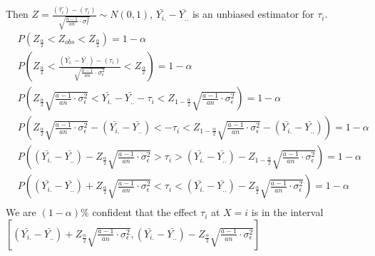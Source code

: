 \documentclass[11pt,letterpaper]{article}
\let\hat\widehat
\begin{document}
\noindent Then $Z = \frac{(\hat{\tau_i}) - (\tau_i)  }{\sqrt{\frac{a-1}{an} \cdot \sigma_{\epsilon}^2} } \sim N(0, 1)$, $\bar{Y_{i.}} - \bar{Y_{..}}$ is an unbiased estimator for $\tau_i$.
\begin{align*}
& P(Z_{\frac{\alpha}{2}} < Z_{obs} < Z_{\frac{\alpha}{2}}) = 1 - \alpha \\
& P(Z_{\frac{\alpha}{2}} <  \frac{(\bar{Y_{i.}} - \bar{Y_{..}}) - (\tau_i)  }{\sqrt{\frac{a-1}{an} \cdot \sigma_{\epsilon}^2} } < Z_{\frac{\alpha}{2}}) = 1 - \alpha \\
& P( Z_{\frac{\alpha}{2}} \sqrt{\frac{a-1}{an} \cdot \sigma_{\epsilon}^2} < \bar{Y_{i.}} - \bar{Y_{..}} - \tau_i < Z_{1-\frac{\alpha}{2}} \sqrt{\frac{a-1}{an} \cdot \sigma_{\epsilon}^2}) = 1 - \alpha \\
& P( Z_{\frac{\alpha}{2}} \sqrt{\frac{a-1}{an} \cdot \sigma_{\epsilon}^2} - ( \bar{Y_{i.}} - \bar{Y_{..}})<  - \tau_i < Z_{1-\frac{\alpha}{2}} \sqrt{\frac{a-1}{an} \cdot \sigma_{\epsilon}^2} - ( \bar{Y_{i.}} - \bar{Y_{..}})) = 1 - \alpha \\
& P( ( \bar{Y_{i.}} - \bar{Y_{..}}) - Z_{\frac{\alpha}{2}} \sqrt{\frac{a-1}{an} \cdot \sigma_{\epsilon}^2} > \tau_i > ( \bar{Y_{i.}} - \bar{Y_{..}}) - Z_{1-\frac{\alpha}{2}} \sqrt{\frac{a-1}{an} \cdot \sigma_{\epsilon}^2} ) = 1 - \alpha \\
& P( ( \bar{Y_{i.}} - \bar{Y_{..}}) + Z_{\frac{\alpha}{2}} \sqrt{\frac{a-1}{an} \cdot \sigma_{\epsilon}^2} < \tau_i < ( \bar{Y_{i.}} - \bar{Y_{..}}) - Z_{\frac{\alpha}{2}} \sqrt{\frac{a-1}{an} \cdot \sigma_{\epsilon}^2} ) = 1 - \alpha \\
\end{align*}
\noindent We are $(1-\alpha) \%$ confident that the effect $\tau_i$ at $X = i$ is in the interval \\ 
$[ ( \bar{Y_{i.}} - \bar{Y_{..}}) + Z_{\frac{\alpha}{2}} \sqrt{\frac{a-1}{an} \cdot \sigma_{\epsilon}^2} , ( \bar{Y_{i.}} - \bar{Y_{..}}) - Z_{\frac{\alpha}{2}} \sqrt{\frac{a-1}{an} \cdot \sigma_{\epsilon}^2} ]$
\end{document}
